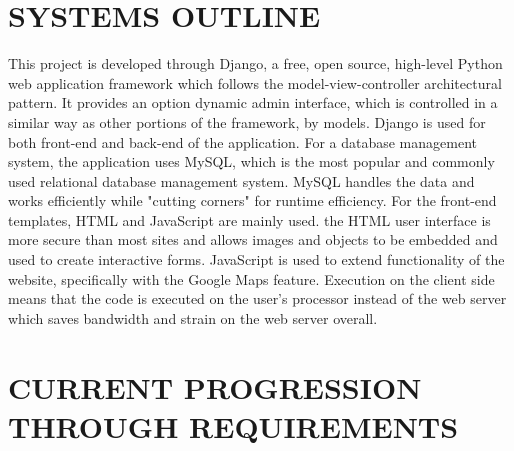 \documentclass[draftclsnofoot,10pt,onecolumn]{IEEEtran} %
\begin{document}
\section{SYSTEMS OUTLINE}
This project is developed through Django, a free, open source, high-level Python web 
application framework which follows the model-view-controller architectural pattern. 
It provides an option dynamic admin interface, which is controlled in a similar way as 
other portions of the framework, by models. Django is used for both front-end and 
back-end of the application.
For a database management system, the application uses MySQL, which is the most popular
and commonly used relational database management system. MySQL handles the data and works 
efficiently while "cutting corners" for runtime efficiency.
For the front-end templates, HTML and JavaScript are mainly used. the HTML user interface 
is more secure than most sites and allows images and objects to be embedded and used to 
create interactive forms. JavaScript is used to extend functionality of the website, 
specifically with the Google Maps feature. Execution on the client side means that the 
code is executed on the user's processor instead of the web server which saves bandwidth 
and strain on the web server overall.

\section{CURRENT PROGRESSION THROUGH REQUIREMENTS}
\end{document}
